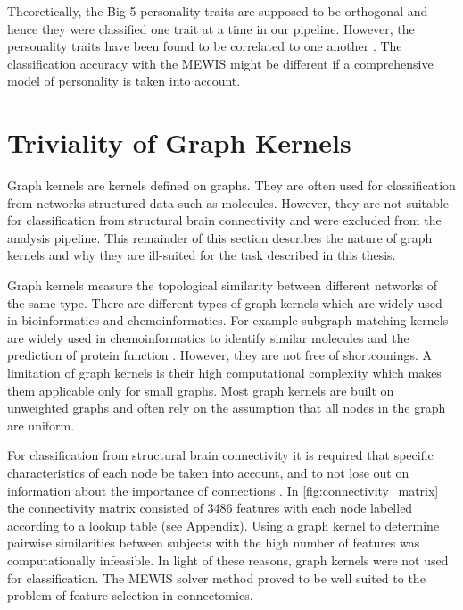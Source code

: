\documentclass[msthesis.tex]{subfiles}
\begin{document}
Theoretically, the Big 5 personality traits are supposed to be orthogonal and hence they were classified one trait at a time in our pipeline. However, the personality traits have been found to be correlated to one another \citep{blackburn2004big}. The classification accuracy with the \gls{MEWIS} might be different if a comprehensive model of personality is taken into account.
\iffalse
The reduced subgraphs obtained by using t-test and f-scores as edge weights lacked predictive power and often performed worse than the baseline experiments.
\fi
\section{Triviality of Graph Kernels}
Graph kernels are kernels defined on graphs. They are often used for classification from networks structured data such as molecules. However, they are not suitable for classification from structural brain connectivity and were excluded from the analysis pipeline. This remainder of this section describes the nature of graph kernels and why they are ill-suited for the task described in this thesis.

Graph kernels measure the topological similarity between different networks of the same type. There are different types of graph kernels which are widely used in bioinformatics and chemoinformatics. For example subgraph matching kernels are widely used in chemoinformatics to identify similar molecules and the prediction of protein function \citep{nils2012}. However, they are not free of shortcomings. A limitation of graph kernels is their high computational complexity which makes them applicable only for small graphs. Most graph kernels are built on unweighted graphs and often rely on the assumption that all nodes in the graph are uniform.

For classification from structural brain connectivity it is required that specific characteristics of each node be taken into account, and to not lose out on information about the importance of connections \citep{jie2018sub}. In \autoref{fig:connectivity_matrix} the connectivity matrix consisted of 3486 features with each node labelled according to a lookup table (see Appendix). Using a graph kernel to determine pairwise similarities between subjects with the high number of features was computationally infeasible. In light of these reasons, graph kernels were not used for classification. The \gls{MEWIS} solver method proved to be well suited to the problem of feature selection in connectomics.

\iffalse
The unlabelled ones cannot get any information about brain networks since there is not meaning of comparing networks containing two different regions. Also computational complexity and density of brain networks leads to a bottleneck since computing kernel functions for such graphs is conclusive.  Isomorphism does not exist. 
. Using the existing framework the similarity of two networks cannot well reflect their topological characteristics.
\fi
\end{document}
